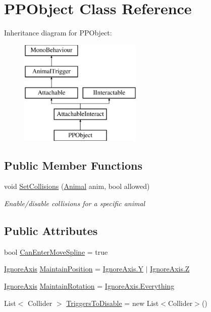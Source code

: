 \hypertarget{class_p_p_object}{}\section{P\+P\+Object Class Reference}
\label{class_p_p_object}
Inheritance diagram for P\+P\+Object\+:\begin{figure}[H]
\begin{center}
\leavevmode
\includegraphics[height=5.000000cm]{class_p_p_object}
\end{center}
\end{figure}
\subsection*{Public Member Functions}
\begin{DoxyCompactItemize}
\item 
void \mbox{\hyperlink{class_p_p_object_a6a35b92bb58b0e3b5e8f7857940ada54}{Set\+Collisions}} (\mbox{\hyperlink{class_animal}{Animal}} anim, bool allowed)
\begin{DoxyCompactList}\small\item\em Enable/disable collisions for a specific animal \end{DoxyCompactList}\end{DoxyCompactItemize}
\subsection*{Public Attributes}
\begin{DoxyCompactItemize}
\item 
bool \mbox{\hyperlink{class_p_p_object_a7df76e4799e0afc65ac5fa5bf8f5c33c}{Can\+Enter\+Move\+Spline}} = true
\item 
\mbox{\hyperlink{_ignore_axis_8cs_aa61b0141055d583a4f5b013297a1d48f}{Ignore\+Axis}} \mbox{\hyperlink{class_p_p_object_ad6ffb2bd4353f3ebf44561da0fb9f352}{Maintain\+Position}} = \mbox{\hyperlink{_ignore_axis_8cs_aa61b0141055d583a4f5b013297a1d48fa57cec4137b614c87cb4e24a3d003a3e0}{Ignore\+Axis.\+Y}} $\vert$ \mbox{\hyperlink{_ignore_axis_8cs_aa61b0141055d583a4f5b013297a1d48fa21c2e59531c8710156d34a3c30ac81d5}{Ignore\+Axis.\+Z}}
\item 
\mbox{\hyperlink{_ignore_axis_8cs_aa61b0141055d583a4f5b013297a1d48f}{Ignore\+Axis}} \mbox{\hyperlink{class_p_p_object_a5b0142f71e2f406feabe00f1fb17f062}{Maintain\+Rotation}} = \mbox{\hyperlink{_ignore_axis_8cs_aa61b0141055d583a4f5b013297a1d48fa709468af25e91284821d1bdbfdded24c}{Ignore\+Axis.\+Everything}}
\item 
List$<$ Collider $>$ \mbox{\hyperlink{class_p_p_object_a980e154549866d63adac0ab449fac07e}{Triggers\+To\+Disable}} = new List$<$Collider$>$()
\end{DoxyCompactItemize}

